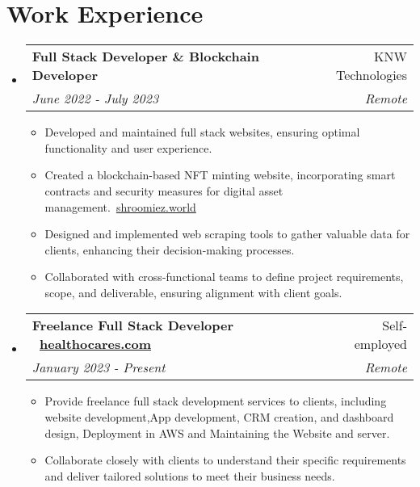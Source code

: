 \documentclass[a4paper,11pt]{article}
\makeatletter
\newcommand{\resumeSubheading}[4]{
  \vspace{-1pt}\item
    \begin{tabular*}{0.97\textwidth}{l@{\extracolsep{\fill}}r}
      \textbf{#1} & #2 \\
      \textit{#3} & \textit{#4} \\
    \end{tabular*}\vspace{-5pt}
}
\newcommand{\resumeSubHeadingListStart}{\begin{itemize}[leftmargin=15pt]}
\newcommand{\resumeSubHeadingListEnd}{\end{itemize}}
\makeatother
\begin{document}
\section{Work Experience}
\resumeSubHeadingListStart

\resumeSubheading
{Full Stack Developer \& Blockchain Developer}
{KNW Technologies}
{June 2022 - July 2023}
{Remote}
\vspace{-5pt}
{\large
\begin{itemize}
\item Developed and maintained full stack websites, ensuring optimal functionality and user experience.

\item Created a blockchain-based NFT minting website, incorporating smart contracts and security measures for digital asset management.{\faGlobe~\href{https://www.shroomiez.world/}{\normalsize shroomiez.world}}

\item Designed and implemented web scraping tools to gather valuable data for clients, enhancing their decision-making processes.

\item Collaborated with cross-functional teams to define project requirements, scope, and deliverable, ensuring alignment with client goals.
\end{itemize}
}

\resumeSubheading
{Freelance Full Stack Developer {\faGlobe~\href{https://www.healthocares.com/}{\normalsize healthocares.com}}}
{Self-employed}
{January 2023 - Present}
{Remote}
\vspace{-5pt}
{\large
\begin{itemize}
\item Provide freelance full stack development services to clients, including website development,App development, CRM creation, and dashboard design, Deployment in AWS and Maintaining the Website and server.
\item Collaborate closely with clients to understand their specific requirements and deliver tailored solutions to meet their business needs.
\end{itemize}
}
\resumeSubHeadingListEnd

\end{document}
